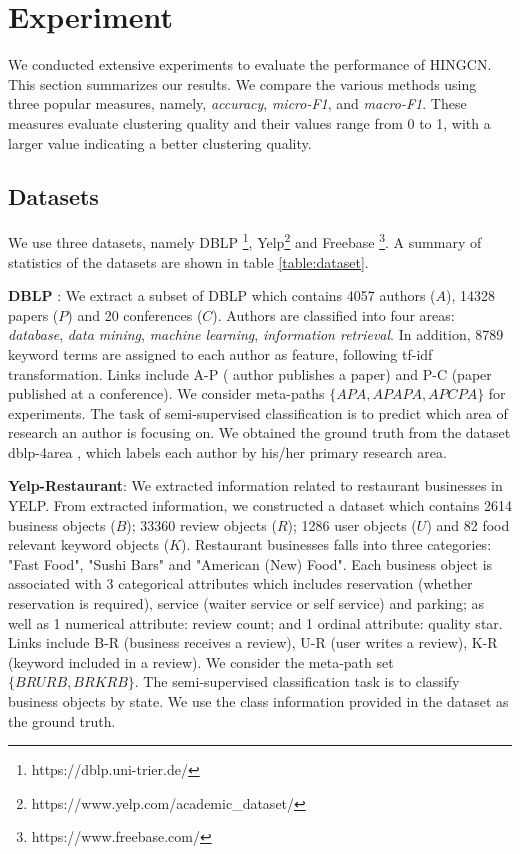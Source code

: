 \section{Experiment}
\label{sec:exp}
We conducted extensive experiments
to evaluate the performance of HINGCN.
This section summarizes our results. 
We compare the various methods using three popular measures, 
namely, \emph{accuracy}, \emph{micro-F1}, and \emph{macro-F1}.
These measures evaluate clustering quality and their values range from 0 to 1, 
with a larger value indicating a better
clustering quality. 

\subsection{Datasets}
We use three datasets, namely DBLP \footnote{https://dblp.uni-trier.de/}, Yelp\footnote{https://www.yelp.com/academic{\_}dataset/} and Freebase \footnote{https://www.freebase.com/}. A summary of statistics of the datasets are shown in table \ref{table:dataset}.

\noindent{\small$\bullet$}
\textbf{DBLP }: We extract a subset of DBLP which contains 4057 authors ($A$), 14328 papers ($P$) and 20 conferences ($C$). Authors are classified into four areas: \textit{database}, \textit{data mining}, \textit{machine learning}, \textit{information retrieval}. In addition, 8789 keyword terms are assigned to each author as feature, following tf-idf transformation. 
Links include A-P ( author publishes a paper) and P-C (paper published at a conference).
We consider meta-paths $\{APA,APAPA,APCPA\}$ for experiments. The task of semi-supervised classification is to predict which area of research an author is focusing on.
We obtained the ground truth from the dataset dblp-4area \cite{SunYH09}, which
labels each author by his/her primary research area.

\noindent{\small$\bullet$}
\textbf{Yelp-Restaurant}: We extracted information related to restaurant businesses in YELP. From extracted information, we constructed a dataset which contains 2614 business objects ($B$); 33360 review objects ($R$); 1286 user objects ($U$) and 82 food relevant keyword objects ($K$).
Restaurant businesses falls into three categories: "Fast Food", "Sushi Bars" and "American (New) Food".
Each business object is associated with 3 categorical attributes which includes reservation (whether reservation is required), service (waiter service or self service) and parking; as well as 1 numerical attribute: review count; and 1 ordinal attribute: quality star.
Links include B-R (business receives a review), U-R (user writes a review), K-R (keyword included in a review). We consider the meta-path set $\{BRURB, BRKRB\}$. The semi-supervised classification task is to classify business objects by state. We use the class information provided in the dataset as the ground truth.


